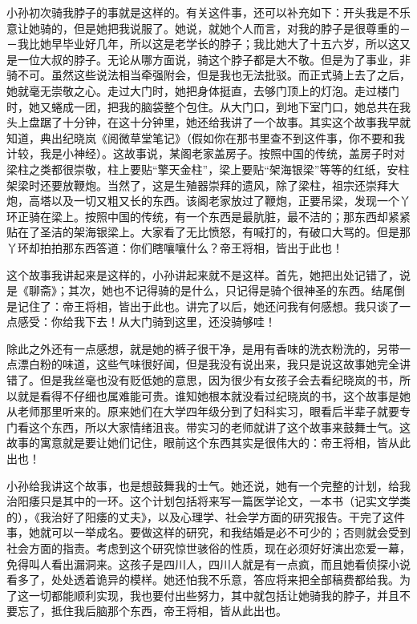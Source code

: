 小孙初次骑我脖子的事就是这样的。有关这件事，还可以补充如下：开头我是不乐意让她骑的，但是她把我说服了。她说，就她个人而言，对我的脖子是很尊重的－－我比她早毕业好几年，所以这是老学长的脖子；我比她大了十五六岁，所以这又是一位大叔的脖子。无论从哪方面说，骑这个脖子都是大不敬。但是为了事业，非骑不可。虽然这些说法相当牵强附会，但是我也无法批驳。而正式骑上去了之后，她就毫无崇敬之心。走过大门时，她把身体挺直，去够门顶上的灯泡。走过楼门时，她又蜷成一团，把我的脑袋整个包住。从大门口，到地下室门口，她总共在我头上盘踞了十分钟，在这十分钟里，她还给我讲了一个故事。其实这个故事我早就知道，典出纪晓岚《阅微草堂笔记》（假如你在那书里查不到这件事，你不要和我计较，我是小神经）。这故事说，某阁老家盖房子。按照中国的传统，盖房子时对梁柱之类都很崇敬，柱上要贴“擎天金柱”，梁上要贴“架海银梁”等等的红纸，安柱架梁时还要放鞭炮。当然了，这是生殖器崇拜的遗风，除了梁柱，祖宗还崇拜大炮，高塔以及一切又粗又长的东西。该阁老家放过了鞭炮，正要吊梁，发现一个丫环正骑在梁上。按照中国的传统，有一个东西是最肮脏，最不洁的；那东西却紧紧贴在了圣洁的架海银梁上。大家看了无比愤怒，有喊打的，有破口大骂的。但是那丫环却拍拍那东西答道：你们瞎嚷嚷什么？帝王将相，皆出于此也！ 

这个故事我讲起来是这样的，小孙讲起来就不是这样。首先，她把出处记错了，说是《聊斋》；其次，她也不记得骑的是什么，只记得是骑个很神圣的东西。结尾倒是记住了：帝王将相，皆出于此也。讲完了以后，她还问我有何感想。我只谈了一点感受：你给我下去！从大门骑到这里，还没骑够哇！ 

除此之外还有一点感想，就是她的裤子很干净，是用有香味的洗衣粉洗的，另带一点漂白粉的味道，这些气味很好闻，但是我没有说出来，我只是说这故事她完全讲错了。但是我丝毫也没有贬低她的意思，因为很少有女孩子会去看纪晓岚的书，所以就是看得不仔细也属难能可贵。谁知她根本就没看过纪晓岚的书，这个故事是她从老师那里听来的。原来她们在大学四年级分到了妇科实习，眼看后半辈子就要专门看这个东西，所以大家情绪沮丧。带实习的老师就讲了这个故事来鼓舞士气。这故事的寓意就是要让她们记住，眼前这个东西其实是很伟大的：帝王将相，皆从此出也！ 

小孙给我讲这个故事，也是想鼓舞我的士气。她还说，她有一个完整的计划，给我治阳痿只是其中的一环。这个计划包括将来写一篇医学论文，一本书（记实文学类的），《我治好了阳痿的丈夫》，以及心理学、社会学方面的研究报告。干完了这件事，她就可以一举成名。要做这样的研究，和我结婚是必不可少的；否则就会受到社会方面的指责。考虑到这个研究惊世骇俗的性质，现在必须好好演出恋爱一幕，免得叫人看出漏洞来。这孩子是四川人，四川人就是有一点疯，而且她看侦探小说看多了，处处透着诡异的模样。她还怕我不乐意，答应将来把全部稿费都给我。为了这一切都能顺利实现，我也要付出些努力，其中就包括让她骑我的脖子，并且不要忘了，抵住我后脑那个东西，帝王将相，皆从此出也。 

